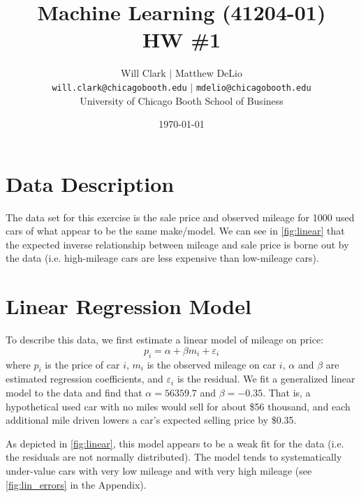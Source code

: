 \documentclass[11pt, fleqn]{article}
\begin{document}
\title{Machine Learning (41204-01)\\HW \#1}
\author{Will Clark $\vert$ Matthew DeLio \\
\texttt{will.clark@chicagobooth.edu} $\vert$ \texttt{mdelio@chicagobooth.edu} \\
University of Chicago Booth School of Business}
\date{\today}
\maketitle


\section{Data Description}

The data set for this exercise is the sale price and observed mileage for 1000 used cars of what appear to be the same make/model. We can see in \cref{fig:linear} that the expected inverse relationship between mileage and sale price is borne out by the data (i.e. high-mileage cars are less expensive than low-mileage cars).

\section{Linear Regression Model}\label{sec:linear}

To describe this data, we first estimate a linear model of mileage on price:
\[ p_i = \alpha + \beta m_i + \varepsilon_i \]
where \(p_i\) is the price of car \(i\), \(m_i\) is the observed mileage on car \(i\), \(\alpha\) and \(\beta\) are estimated regression coefficients, and \(\varepsilon_i\) is the residual. We fit a generalized linear model to the data and find that \(\alpha=56359.7\) and \(\beta=-0.35\). That is, a hypothetical used car with no miles would sell for about \$56 thousand, and each additional mile driven lowers a car's expected selling price by \$0.35.

As depicted in \cref{fig:linear}, this model appears to be a weak fit for the data (i.e. the residuals are not normally distributed). The model tends to systematically under-value cars with very low mileage and with very high mileage (see \cref{fig:lin_errors} in the Appendix). 
\end{document}
